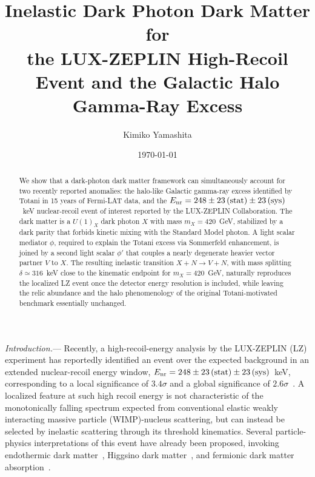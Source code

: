 \documentclass[aps,prl,twocolumn,superscriptaddress,nofootinbib]{revtex4-2}
\begin{document}
\title{Inelastic Dark Photon Dark Matter for\\ the LUX-ZEPLIN High-Recoil Event and the Galactic Halo Gamma-Ray Excess}

\author{Kimiko Yamashita}

\date{\today}

\begin{abstract}
We show that a dark-photon dark matter framework can simultaneously
account for two recently reported anomalies: the halo-like Galactic
gamma-ray excess identified by Totani in 15 years of Fermi-LAT data, and
the $E_{\rm nr}=248\pm23\,({\rm stat})\pm23\,({\rm sys})$~keV nuclear-recoil
event of interest reported by the LUX-ZEPLIN Collaboration.
The dark matter is a $U(1)_X$ dark photon $X$ with mass $m_X=420$~GeV,
stabilized by a dark parity that forbids kinetic mixing with the Standard
Model photon. A light scalar mediator $\phi$, required to explain
the Totani excess via Sommerfeld enhancement, is joined by a second
light scalar $\phi'$ that couples a
nearly degenerate heavier vector partner $V$ to $X$. The resulting
inelastic transition $X+N\to V+N$, with mass splitting
$\delta\simeq316$~keV close to the kinematic endpoint for $m_X=420$~GeV,
naturally reproduces the localized LZ event once the detector energy
resolution is included, while leaving the relic abundance and the halo
phenomenology of the original Totani-motivated benchmark essentially
unchanged.
\end{abstract}

\maketitle

\textit{Introduction.}---%
Recently, a high-recoil-energy analysis by the LUX-ZEPLIN (LZ) experiment
has reportedly identified an event over the expected background in an
extended nuclear-recoil energy window, $E_{\rm nr}=248\pm23\,({\rm stat})
\pm23\,({\rm sys})$~keV, corresponding to a local significance of $3.4\sigma$
and a global significance of $2.6\sigma$~\cite{LZ2026}. A localized
feature at such high recoil energy is not
characteristic of the monotonically falling spectrum expected from
conventional elastic weakly interacting massive particle (WIMP)-nucleus
scattering, but can instead be selected by inelastic scattering through its
threshold kinematics. Several particle-physics interpretations of this
event have already been proposed, invoking endothermic dark
matter~\cite{Su2026}, Higgsino dark matter~\cite{Freese2026,Wu2026}, and
fermionic dark matter absorption~\cite{Lou2026}.
\end{document}
